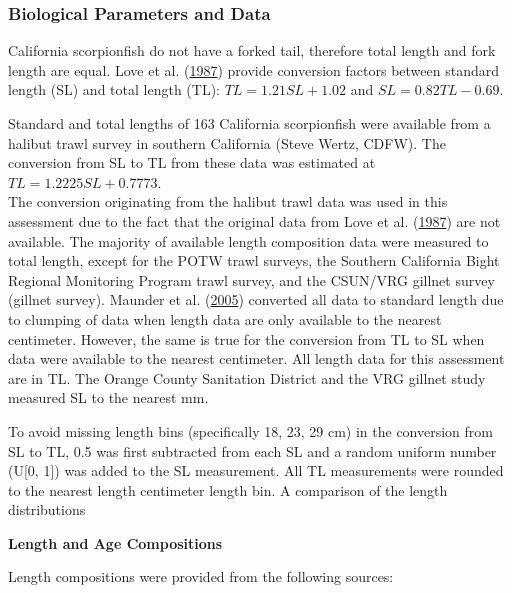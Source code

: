 \documentclass[12pt,]{article}
\begin{document}
\subsubsection{Biological Parameters and
Data}\label{biological-parameters-and-data}

California scorpionfish do not have a forked tail, therefore total
length and fork length are equal. Love et al.
(\protect\hyperlink{ref-Love1987}{1987}) provide conversion factors
between standard length (SL) and total length (TL):
\(TL = 1.21SL + 1.02\) and \(SL = 0.82TL - 0.69\).

Standard and total lengths of 163 California scorpionfish were available
from a halibut trawl survey in southern California (Steve Wertz, CDFW).
The conversion from SL to TL from these data was estimated at
\(TL = 1.2225SL + 0.7773\).\\
The conversion originating from the halibut trawl data was used in this
assessment due to the fact that the original data from Love et al.
(\protect\hyperlink{ref-Love1987}{1987}) are not available. The majority
of available length composition data were measured to total length,
except for the POTW trawl surveys, the Southern California Bight
Regional Monitoring Program trawl survey, and the CSUN/VRG gillnet
survey (gillnet survey). Maunder et al.
(\protect\hyperlink{ref-Maunder2005}{2005}) converted all data to
standard length due to clumping of data when length data are only
available to the nearest centimeter. However, the same is true for the
conversion from TL to SL when data were available to the nearest
centimeter. All length data for this assessment are in TL. The Orange
County Sanitation District and the VRG gillnet study measured SL to the
nearest mm.

To avoid missing length bins (specifically 18, 23, 29 cm) in the
conversion from SL to TL, 0.5 was first subtracted from each SL and a
random uniform number (U{[}0, 1{]}) was added to the SL measurement. All
TL measurements were rounded to the nearest length centimeter length
bin. A comparison of the length distributions

\textbf{Length and Age Compositions}

Length compositions were provided from the following sources:
\end{document}

